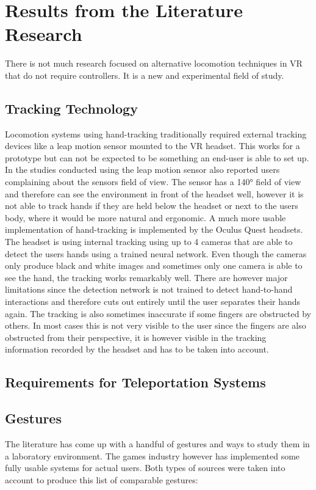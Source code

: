 \chapter{Results from the Literature Research}

There is not much research focused on alternative locomotion techniques in VR that do not require controllers. It is a new and experimental field of study.

\section{Tracking Technology}
Locomotion systems using hand-tracking traditionally required external tracking devices like a leap motion sensor mounted to the VR headset. %
This works for a prototype but can not be expected to be something an end-user is able to set up. In the studies conducted using the leap motion sensor also reported users complaining about the sensors field of view. %
The sensor has a 140° field of view and therefore can see the environment in front of the headset well, however it is not able to track hands if they are held below the headset or next to the users body, where it would be more natural and ergonomic. A much more usable implementation of hand-tracking is implemented by the Oculus Quest headsets. %
The headset is using internal tracking using up to 4 cameras that are able to detect the users hands using a trained neural network. %
Even though the cameras only produce black and white images and sometimes only one camera is able to see the hand, the tracking works remarkably well. There are however major limitations since the detection network is not trained to detect hand-to-hand interactions and therefore cuts out entirely until the user separates their hands again. The tracking is also sometimes inaccurate if some fingers are obstructed by others. In most cases this is not very visible to the user since the fingers are also obstructed from their perspective, it is however visible in the tracking information recorded by the headset and has to be taken into account. 

\section{Requirements for Teleportation Systems}



\section{Gestures}
The literature has come up with a handful of gestures and ways to study them in a laboratory environment. The games industry however has implemented some fully usable systems for actual users. Both types of sources were taken into account to produce this list of comparable gestures:

